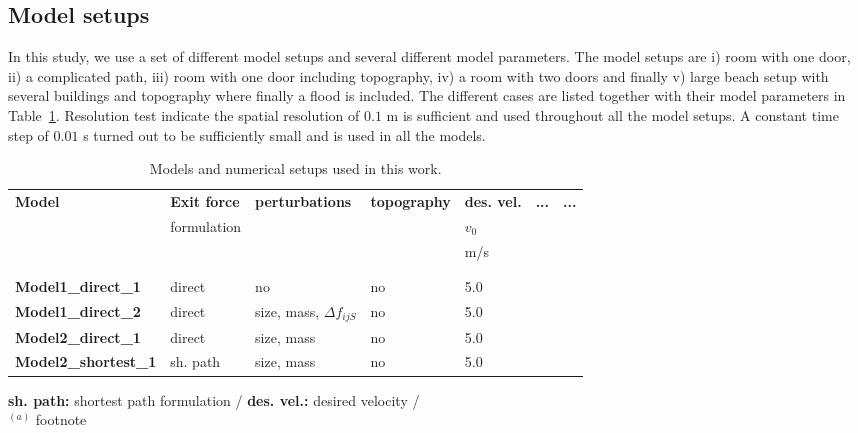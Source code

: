 \documentclass[11pt]{article}
\begin{document}
\subsection{Model setups}

In this study, we use a set of different model setups and several different model parameters. The model setups are i) room with one door, ii) a complicated path, iii) room with one door including topography, iv) a room with two doors and finally v) large beach setup with several buildings and topography where finally a flood is included. The different cases are listed together with their model parameters in Table~\ref{tab:Parameters}. Resolution test indicate the spatial resolution of $0.1$ m is sufficient and used throughout all the model setups. A constant time step of $0.01$ s turned out to be sufficiently small and is used in all the models.


\begin{landscape}
\begin{table}  
	 \begin{footnotesize}
	\caption{Models and numerical setups used in this work.}
	\label{tab:Parameters}
	\begin{tabular}{p{2.9cm} p{2.0cm} p{2.5cm} p{2.0cm} p{2.0cm} p{2.0cm} p{2.0cm} }
	\hline
	 \textbf{Model} & \textbf{Exit force} & \textbf{perturbations} & \textbf{topography} & \textbf{des. vel.} & \textbf{...} & \textbf{...}\\
	 & formulation & & & $v_{0}$    \\
	 & & & & m/s &   \\
	\hline
		&  \\
			&   \\
	\hline
	{\bf Model1\_direct\_1}	& direct 	& no			& no	& 5.0 & 			\\
	{\bf Model1\_direct\_2}	& direct 	& size, mass, $\Delta f_{ijS}$ 	& no 	& 5.0 &		\\
	{\bf Model2\_direct\_1}	& direct 	& size, mass 	& no 	& 5.0	 &				\\
	{\bf Model2\_shortest\_1}	& sh. path & size, mass 	& no 	& 5.0	 &			\\
	\hline
	\end{tabular}
	
	{\bf sh. path:} shortest path formulation / {\bf des. vel.:} desired velocity /    \\
	$^{(a)}$ footnote
	\end{footnotesize}
\end{table}
\end{landscape}
\end{document}
